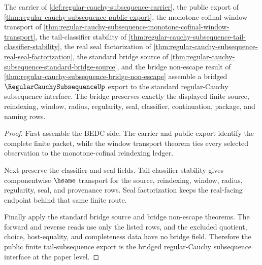 \begin{theorem}
\label{thm:regular-cauchy-subsequence-bridged-export}
The carrier of \autoref{def:regular-cauchy-subsequence-carrier}, the public export of \autoref{thm:regular-cauchy-subsequence-public-export}, the monotone-cofinal window transport of \autoref{thm:regular-cauchy-subsequence-monotone-cofinal-window-transport}, the tail-classifier stability of \autoref{thm:regular-cauchy-subsequence-tail-classifier-stability}, the real seal factorization of \autoref{thm:regular-cauchy-subsequence-real-seal-factorization}, the standard bridge source of \autoref{thm:regular-cauchy-subsequence-standard-bridge-source}, and the bridge non-escape result of \autoref{thm:regular-cauchy-subsequence-bridge-non-escape} assemble a bridged $\RegularCauchySubsequenceUp$ export to the standard regular-Cauchy subsequence interface. The bridge preserves exactly the displayed finite source, reindexing, window, radius, regularity, seal, classifier, continuation, package, and naming rows.
\end{theorem}
\begin{proof}
First assemble the BEDC side. The carrier and public export identify the complete finite packet, while the window transport theorem ties every selected observation to the monotone-cofinal reindexing ledger.

Next preserve the classifier and seal fields. Tail-classifier stability gives componentwise $\hsame$ transport for the source, reindexing, window, radius, regularity, seal, and provenance rows. Seal factorization keeps the real-facing endpoint behind that same finite route.

Finally apply the standard bridge source and bridge non-escape theorems. The forward and reverse reads use only the listed rows, and the excluded quotient, choice, host-equality, and completeness data have no bridge field. Therefore the public finite tail-subsequence export is the bridged regular-Cauchy subsequence interface at the paper level.
\end{proof}


